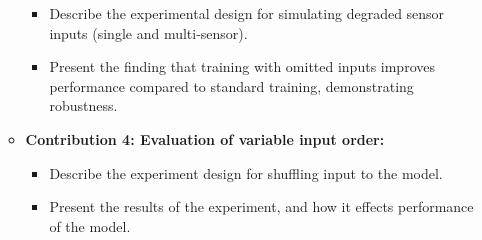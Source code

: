 \begin{itemize}
\begin{itemize}
        \begin{itemize}
            \item Describe the experimental design for simulating degraded sensor inputs (single and multi-sensor).
            \item Present the finding that training with omitted inputs improves performance compared to standard training, demonstrating robustness.
        \end{itemize}
        \item \textbf{Contribution 4: Evaluation of variable input order:}
        \begin{itemize}
            \item Describe the experiment design for shuffling input to the model.
            \item Present the results of the experiment, and how it effects performance of the model.
        \end{itemize}
    \end{itemize}
\end{itemize}



